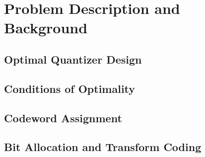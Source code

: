 \documentclass[10pt]{article}
\begin{document}
\section{Problem Description and Background}

\subsection{Optimal Quantizer Design}

\subsection{Conditions of Optimality}

\subsection{Codeword Assignment}

\subsection{Bit Allocation and Transform Coding}
\end{document}
